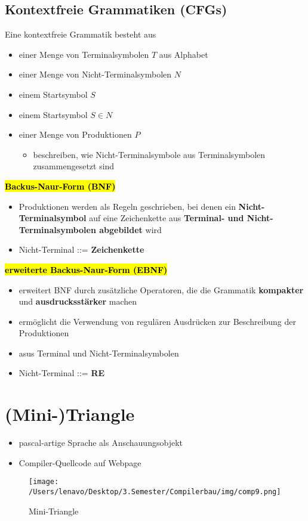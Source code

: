\documentclass[a4paper, 10pt]{article}
\begin{document}
\subsection{Kontextfreie Grammatiken (CFGs)}
Eine kontextfreie Grammatik besteht aus
\begin{itemize}
    \item einer Menge von Terminalsymbolen $T$ aus Alphabet
    \item einer Menge von Nicht-Terminalsymbolen $N$
    \item einem Startsymbol $S $
    \item einem Startsymbol $ S \in N$
    \item einer Menge von Produktionen $P$
    \begin{itemize}
        \item beschreiben, wie Nicht-Terminalsymbole aus Terminalsymbolen zusammengesetzt sind
    \end{itemize}
\end{itemize}
\textbf{\hl{Backus-Naur-Form (BNF)}}
\begin{itemize}
    \item  Produktionen werden als Regeln geschrieben, bei denen ein \textbf{Nicht-Terminalsymbol} auf eine Zeichenkette aus \textbf{Terminal- und Nicht-Terminalsymbolen abgebildet} wird
    \item Nicht-Terminal ::= \textbf{Zeichenkette}
\end{itemize}
\textbf{\hl{erweiterte Backus-Naur-Form (EBNF)}}
\begin{itemize}
    \item erweitert BNF durch zusätzliche Operatoren, die die Grammatik \textbf{kompakter} und \textbf{ausdrucksstärker} machen
    \item ermöglicht die Verwendung von regulären Ausdrücken zur Beschreibung der Produktionen
    \item asus Terminal und Nicht-Terminalsymbolen
    \item Nicht-Terminal ::= \textbf{RE}
\end{itemize}

\section{(Mini-)Triangle}
\begin{itemize}
    \item pascal-artige Sprache als Anschauungsobjekt
    \item Compiler-Quellcode auf Webpage
\end{itemize}
\begin{figure}[h]
    \centering
    \texttt{[image: /Users/lenavo/Desktop/3.Semester/Compilerbau/img/comp9.png]}
    \caption{Mini-Triangle}
    \label{fig:enter-label}
\end{figure}
\end{document}
